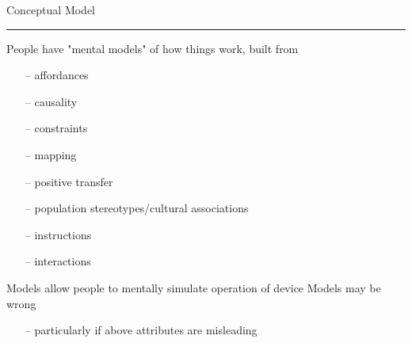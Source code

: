 \documentclass[pdf]{beamer}
\begin{document}
  
   
  \begin{frame}
  {Conceptual Model}{\textcolor{red}{\rule{12cm}{1.2pt}}}

       People have "mental models" of how things work, built from
        \begin{itemize}
      \item [--]\small{affordances}
      \item [--]\small{causality}
      \item [--]\small{constraints}
      \item [--]\small{mapping}
      \item [--]\small{positive transfer}
      \item [--]\small{population stereotypes/cultural associations}
      \item [--]\small{instructions}
      \item [--]\small{interactions}
      \newline
    \end{itemize}
    
  	Models allow people to mentally simulate operation of device
   \newline 
   \newline 
   Models may be wrong
       \begin{itemize}
      \item [--]\small{particularly if above attributes are misleading}
      \end{itemize}
  \end{frame}



  
\end{document}

